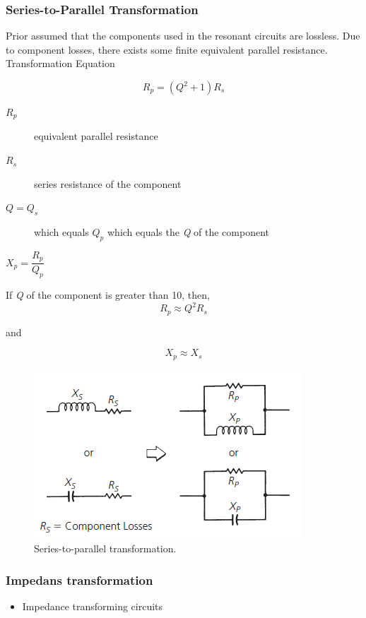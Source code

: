 \subsubsection{Series-to-Parallel Transformation}
Prior assumed that the components used in the resonant circuits are lossless. Due to component losses, there exists some finite equivalent parallel resistance.\\

\noindent Transformation Equation

\begin{equation}
R_p = (Q^2 +1)R_s
\end{equation}

\begin{description}
	\item[$R_p$] equivalent parallel resistance
	\item[$R_s$] series resistance of the component
	\item[$Q = Q_s$] which equals $Q_p$ which equals the \textit{Q} of the component
	\item[$X_p = \dfrac{R_p}{Q_p}$]
\end{description}

\noindent If \textit{Q} of the component is greater than 10, then,
\begin{equation}
R_p \approx Q^2 R_s
\end{equation}

\noindent and

\begin{equation}
X_p \approx X_s
\end{equation}
\begin{figure} [H]
	\centering
	\includegraphics[width=0.5\linewidth]{graphics/23.png}
	\caption{Series-to-parallel transformation.}
\end{figure}
\newpage
\subsubsection{Impedans transformation}
\begin{itemize}
	\item Impedance transforming circuits
\end{itemize}

